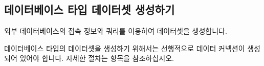 \documentclass[letterpaper,10pt,english]{sphinxmanual}
\begin{document}
\subsection{데이터베이스 타입 데이터셋 생성하기}
\label{\detokenize{discovery/part07/create_a_dataset:create-a-dataset-of-database}}\label{\detokenize{discovery/part07/create_a_dataset:id3}}
외부 데이터베이스의 접속 정보와 쿼리를 이용하여 데이터셋을 생성합니다.

데이터베이스 타입의 데이터셋을 생성하기 위해서는 선행적으로 데이터 커넥션이 생성되어 있어야 합니다. 자세한 절차는 {\hyperref[\detokenize{discovery/part02/data_connection:create-data-connection}]{}} 항목을 참조하십시오.
\begin{quote}

\begin{figure}[H]
\centering

\noindent{}
\end{figure}
\end{quote}
\end{document}
